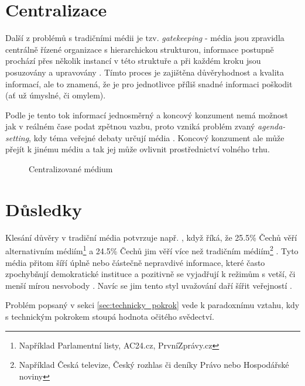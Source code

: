 \documentclass{report}
\begin{document}
\section{Centralizace}
\label{sec:centralizace}
Další z problémů s tradičními médii je tzv. \textit{gatekeeping} - média jsou zpravidla centrálně řízené organizace s hierarchickou strukturou, informace postupně prochází přes několik instancí v této struktuře a při každém kroku jsou posuzovány a upravovány \citep{mazzara13}. Tímto proces je zajištěna důvěryhodnost a kvalita informací, ale to znamená, že je pro jednotlivce příliš snadné informaci poškodit (ať už úmyslné, či omylem).

Podle \citeauthor{mazzara13} je tento tok informací jednosměrný a koncový konzument nemá možnost jak v reálném čase podat zpětnou vazbu, proto vzniká problém zvaný \textit{agenda-setting}, kdy téma veřejné debaty určují média \citep{mazzara13}. Koncový konzument ale může přejít k jinému médiu a tak jej může ovlivnit prostřednictví volného trhu.

\begin{figure}
\centering
{}
\caption{Centralizované médium}
\end{figure}

\section{Důsledky}
\label{sec:dusledky}
Klesání důvěry v tradiční média potvrzuje např. \citeauthor{janda16b}, když říká, že 25.5\% Čechů věří alternativním médiím\footnote{Například Parlamentní listy, AC24.cz, PrvníZprávy.cz} a 24.5\% Čechů jim věří více než tradičním médiím\footnote{Například Česká televize, Český rozhlas či deníky Právo nebo Hospodářské noviny} \citep{janda16b}. Tyto média přitom šíří úplně nebo částečně nepravdivé informace, které často zpochybňují demokratické instituce a pozitivně se vyjadřují k režimům s vetší, či menší mírou nesvobody \citep{janda16a}. Navíc se jim tento styl uvažování daří šířit veřejností \citep{janda16b}.

Problém popsaný v sekci \ref{sec:technicky_pokrok} vede k paradoxnímu vztahu, kdy s technickým pokrokem stoupá hodnota očitého svědectví.
\end{document}
